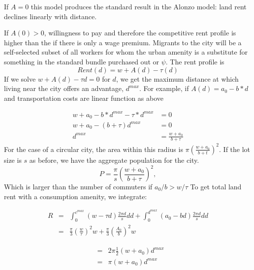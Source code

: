 If $A=0$ %
 this model produces the standard result in the Alonzo model: land rent declines linearly with distance. 
 
If $A(0)>0$, willingness to pay and therefore the competitive rent profile is higher than the if there is only a wage premium.  
Migrants to the city will be a self-selected subset of all workers for whom the urban amenity is a substitute for something in the standard bundle purchased out or $\psi$. 
The rent profile is  
\begin{equation}
Rent(d)  =  w  + A(d) - \tau(d)	
\label{Eqn:Rent-at-d}\end{equation}
If we solve $w+A(d)-\tau d=0$ for $d$, we get the maximum  distance at which living near the city offers an advantage, $d^{max}$. 
For example, if  $A(d)=a_0 - b*d$ and transportation costs are  linear function as above

\begin{eqnarray}
w+ a_0 - b*d^{max} - \tau*d^{max}  	&=0		\nonumber \\
w+a_0 - (b+\tau)d^{max}  	&=0			\nonumber \\
d^{max}				&= \frac{w+a_0}{b+\tau}
\end{eqnarray}
For the case of a circular city, the area within this radius is $\pi \left(\frac{w+a_0}{b+t}\right)^2$. 
If the lot size is $s$ as before, we have the aggregate population for the city. 
 \[P= \frac{\pi}{s}  \left(\frac{w+a_0}{b+\tau}\right)^2,\]
Which is larger than the number of commuters if $a_0/b>w/\tau$%
 To get total land rent with a consumption amenity, we integrate:

\begin{eqnarray}   %
R&=&  \int_0^{c^{max}} ( w-\tau d) \frac{2\pi d}{s}dd 	
	+ 	\int_0^{d^{max}} (a_0- bd	) \frac{2\pi d}{s}dd 	\nonumber \\	
	&=& \frac{\pi}{3}\left(\frac{w}{\tau}\right)^2w
	+	\frac{\pi}{3}\left(\frac{A_0}{b}\right)^2w
\end{eqnarray}




\begin{eqnarray}
					&= &  2\pi\frac{1}{2}(w+a_0)d^{max}\\
					&= &  \pi(w+a_0)d^{max}
\end{eqnarray}

